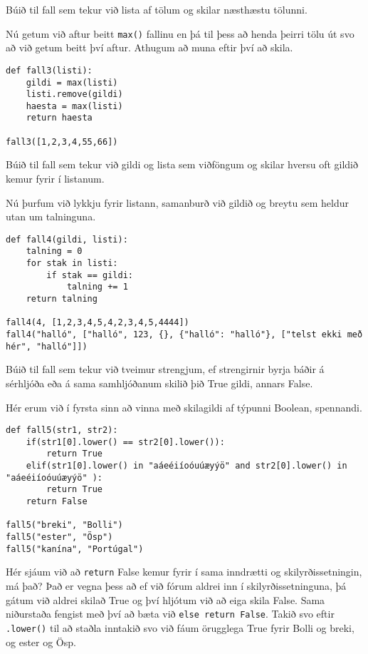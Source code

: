 \begin{exercise}\label{fun3}
Búið til fall sem tekur við lista af tölum og skilar næsthæstu tölunni.
\end{exercise}
\begin{Answer}[ref={fun3}]
Nú getum við aftur beitt \texttt{max()} fallinu en þá til þess að henda þeirri tölu út svo að við getum beitt því aftur.
Athugum að muna eftir því að skila.
	\begin{lstlisting}
def fall3(listi):
	gildi = max(listi)
	listi.remove(gildi)
	haesta = max(listi)
	return haesta

fall3([1,2,3,4,55,66])\end{lstlisting}
\end{Answer}

\begin{exercise}\label{fun4}
Búið til fall sem tekur við gildi og lista sem viðföngum og skilar hversu oft gildið kemur fyrir í listanum.
\end{exercise}
\begin{Answer}[ref={fun4}]
Nú þurfum við lykkju fyrir listann, samanburð við gildið og breytu sem heldur utan um talninguna.
	\begin{lstlisting}
def fall4(gildi, listi):
	talning = 0
	for stak in listi:
		if stak == gildi:
			talning += 1
	return talning

fall4(4, [1,2,3,4,5,4,2,3,4,5,4444])
fall4("halló", ["halló", 123, {}, {"halló": "halló"}, ["telst ekki með hér", "halló"]])\end{lstlisting}
\end{Answer}

\begin{exercise}\label{fun5}
Búið til fall sem tekur við tveimur strengjum, ef strengirnir byrja báðir á sérhljóða eða á sama samhljóðanum skilið þið True gildi, annars False.
\end{exercise}
\begin{Answer}[ref={fun5}]
Hér erum við í fyrsta sinn að vinna með skilagildi af týpunni Boolean, spennandi.


	\begin{lstlisting}
def fall5(str1, str2):
	if(str1[0].lower() == str2[0].lower()):
		return True
	elif(str1[0].lower() in "aáeéiíoóuúæyýö" and str2[0].lower() in "aáeéiíoóuúæyýö" ):
		return True
	return False

fall5("breki", "Bolli")
fall5("ester", "Ösp")
fall5("kanína", "Portúgal")
\end{lstlisting}
Hér sjáum við að \texttt{return} False kemur fyrir í sama inndrætti og skilyrðissetningin, má það?
Það er vegna þess að ef við fórum aldrei inn í skilyrðissetninguna, þá gátum við aldrei skilað True og því hljótum við að eiga skila False.
Sama niðurstaða fengist með því að bæta við \texttt{else return False}.
Takið svo eftir \texttt{.lower()} til að staðla inntakið svo við fáum örugglega True fyrir Bolli og breki, og ester og Ösp.

\end{Answer}

